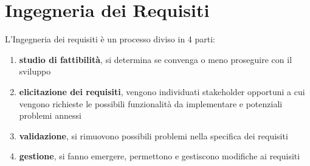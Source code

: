 \section{Ingegneria dei Requisiti}
L'Ingegneria dei requisiti è un processo diviso in 4 parti:
\begin{enumerate}
    \item \textbf{studio di fattibilità}, si determina se convenga o meno proseguire con il sviluppo
    \item \textbf{elicitazione dei requisiti}, vengono individuati {stakeholder} opportuni a cui vengono richieste le possibili funzionalità da implementare e potenziali problemi annessi
    \item \textbf{validazione}, si rimuovono possibili problemi nella specifica dei requisiti
    \item \textbf{gestione}, si fanno emergere, permettono e gestiscono modifiche ai requisiti
\end{enumerate}

